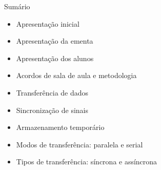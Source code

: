 
\begin{frame}{Sumário}
    \begin{itemize}
        \item Apresentação inicial
        \item Apresentação da ementa
        \item Apresentação dos alunos
        \item Acordos de sala de aula e metodologia
        \item Transferência de dados
        \item Sincronização de sinais
        \item Armazenamento temporário
        \item Modos de transferência: paralela e serial
        \item Tipos de transferência: síncrona e assíncrona
    \end{itemize}
\end{frame}